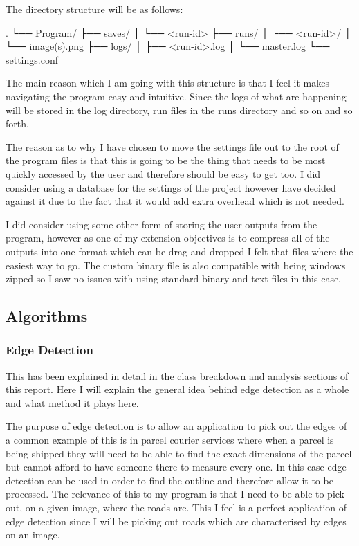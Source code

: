 \begin{FlushLeft}
    The directory structure will be as follows:
    \begin{pseudocode}
    .
    └── Program/
        ├── saves/
        │   └── <run-id>
        ├── runs/
        │   └── <run-id>/
        │       └── image(s).png
        ├── logs/
        │   ├── <run-id>.log
        │   └── master.log
        └── settings.conf
    \end{pseudocode}

    The main reason which I am going with this structure is that I feel it makes navigating the program easy and intuitive. Since the logs of what are happening will be stored in the log directory, run files in the runs directory and so on and so forth. \\ \bk

    The reason as to why I have chosen to move the settings file out to the root of the program files is that this is going to be the thing that needs to be most quickly accessed by the user and therefore should be easy to get too. I did consider using a database for the settings of the project however have decided against it due to the fact that it would add extra overhead which is not needed. \\ \bk

    I did consider using some other form of storing the user outputs from the program, however as one of my extension objectives is to compress all of the outputs into one format which can be drag and dropped I felt that files where the easiest way to go. The custom binary file is also compatible with being windows zipped so I saw no issues with using standard binary and text files in this case. \\ \bk

    \BK

    \subsection{Algorithms}

    \subsubsection{Edge Detection}
    This has been explained in detail in the class breakdown and analysis sections of this report. Here I will explain the general idea behind edge detection as a whole and what method it plays here. \\ \bk

    The purpose of edge detection is to allow an application to pick out the edges of a common example of this is in parcel courier services where when a parcel is being shipped they will need to be able to find the exact dimensions of the parcel but cannot afford to have someone there to measure every one. In this case edge detection can be used in order to find the outline and therefore allow it to be processed. The relevance of this to my program is that I need to be able to pick out, on a given image, where the roads are. This I feel is a perfect application of edge detection since I will be picking out roads which are characterised by edges on an image. \\ \bk


\end{FlushLeft}
